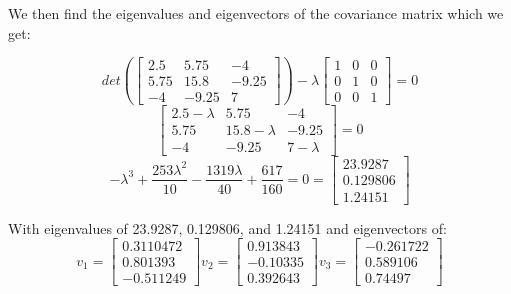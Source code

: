 \documentclass{article}
\begin{document}
We then find the eigenvalues and eigenvectors of the covariance matrix which we get:

\begin{equation*}
    det(\begin{bmatrix}
        2.5 & 5.75 & -4 \\
        5.75 & 15.8 & -9.25 \\
        -4 & -9.25 & 7
    \end{bmatrix}) - \lambda
    \begin{bmatrix}
        1 & 0 & 0 \\
        0 & 1 & 0 \\
        0 & 0 & 1
    \end{bmatrix} = 0
\end{equation*}
\begin{equation*}
    \begin{bmatrix}
        2.5 - \lambda & 5.75 & -4 \\
        5.75 & 15.8 - \lambda & -9.25 \\
        -4 & -9.25 & 7 - \lambda
    \end{bmatrix} = 0
\end{equation*}
\begin{equation*}
    -\lambda^3 + \frac{253\lambda^2}{10} - \frac{1319\lambda}{40} + \frac{617}{160} = 0 = \begin{bmatrix}
        23.9287 \\
        0.129806 \\
        1.24151
    \end{bmatrix}
\end{equation*}

With eigenvalues of 23.9287, 0.129806, and 1.24151 and eigenvectors of:
\begin{equation*}
    v_1 = 
    \begin{bmatrix}
        0.3110472 \\
        0.801393 \\
        -0.511249
    \end{bmatrix}
    v_2 =
    \begin{bmatrix}
        0.913843 \\
        -0.10335 \\
        0.392643
    \end{bmatrix}
    v_3 =
    \begin{bmatrix}
        -0.261722 \\
        0.589106 \\
        0.74497
    \end{bmatrix}
\end{equation*}
\end{document}
